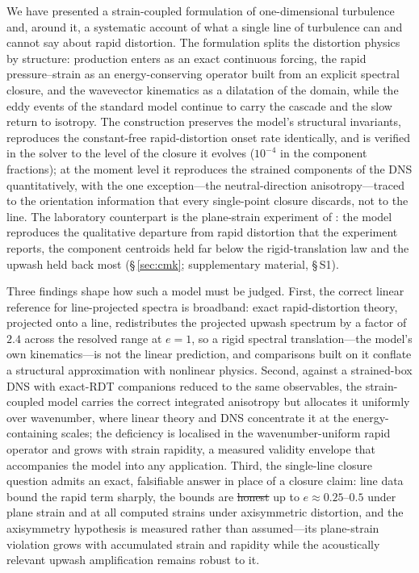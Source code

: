 \documentclass[lineno]{JFM-FLM_Au}
\providecommand{\DIFadd}[1]{{\protect\color{blue}\uwave{#1}}} %
\providecommand{\DIFdel}[1]{{\protect\color{red}\sout{#1}}} %
\providecommand{\DIFaddbegin}{} %
\providecommand{\DIFaddend}{} %
\providecommand{\DIFdelbegin}{} %
\providecommand{\DIFdelend}{} %
\begin{document}
We have presented a strain-coupled formulation of one-dimensional
turbulence and, around it, a systematic account of what a single line of
turbulence can and cannot say about rapid distortion. The formulation
splits the distortion physics by structure: production enters as an
exact continuous forcing, the rapid pressure--strain as an
energy-conserving operator built from an explicit spectral closure, and
the wavevector kinematics as a dilatation of the domain, while the eddy
events of the standard model continue to carry the cascade and the slow
return to isotropy. The construction preserves the model's structural
invariants, reproduces the constant-free rapid-distortion onset rate
identically, and is verified in the solver to the level of the closure
it evolves ($10^{-4}$ in the component fractions); at the moment level
it reproduces the strained components of the \citet{LeeReynolds1985}
DNS quantitatively, with the one exception---the neutral-direction
anisotropy---traced to the orientation information that every
single-point closure discards, not to the line. The laboratory
counterpart is the plane-strain experiment of
\citet{ChenMeneveauKatz2006}: the model reproduces the qualitative
departure from rapid distortion that the experiment reports, the
component centroids held far below the rigid-translation law and the
upwash held back most (\S\,\ref{sec:cmk}; supplementary material,
\S\,S1).

Three findings shape how such a model must be judged. First, the
correct linear reference for line-projected spectra is broadband: exact
rapid-distortion theory, projected onto a line, redistributes the
projected upwash spectrum by a factor of $2.4$ across the resolved range
at $e=1$, so a rigid spectral translation---the model's own
kinematics---is not the linear prediction, and comparisons built on it
conflate a structural approximation with nonlinear physics. Second,
against a strained-box DNS with exact-RDT companions reduced to the
same observables, the strain-coupled model carries the correct
integrated anisotropy but allocates it uniformly over wavenumber, where
linear theory and DNS concentrate it at the energy-containing scales;
the deficiency is localised in the wavenumber-uniform rapid operator
and grows with strain rapidity, a measured validity envelope that
accompanies the model into any application. Third, the single-line
closure question admits an exact, falsifiable answer in place of a
closure claim: line data bound the rapid term sharply, the bounds are \DIFdelbegin \DIFdel{honest }\DIFdelend \DIFaddbegin \DIFadd{valid }\DIFaddend up to $e\approx0.25$--$0.5$ under plane strain and at all
computed strains under axisymmetric distortion, and the axisymmetry
hypothesis is measured rather than assumed---its plane-strain violation
grows with accumulated strain and rapidity while the acoustically
relevant upwash amplification remains robust to it.
\end{document}
